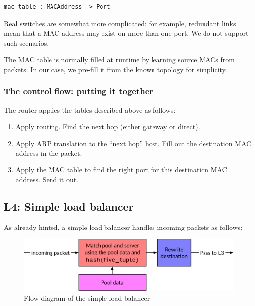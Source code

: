 \documentclass[11pt,oneside,a4paper]{article}
\begin{document}
\begin{verbatim}
mac_table : MACAddress -> Port
\end{verbatim}

Real switches are somewhat more complicated: for example, redundant links mean
that a MAC address may exist on more than one port.
We do not support such scenarios.

The MAC table is normally filled at runtime by learning source MACs from
packets.
In our case, we pre-fill it from the known topology for simplicity.

\subsubsection{The control flow: putting it together}
The router applies the tables described above as follows:

\begin{enumerate}
\item Apply routing.
    Find the next hop (either gateway or direct).
\item Apply ARP translation to the ``next hop'' host.
    Fill out the destination MAC address in the packet.
\item Apply the MAC table to find the right port for this destination MAC address.
    Send it out.
\end{enumerate}

\subsection{L4: Simple load balancer}
As already hinted, a simple load balancer handles incoming packets as follows:

\begin{figure}[h]
\centering
\includegraphics[width=.8\textwidth]{figures/simple-packet.pdf}
\caption{Flow diagram of the simple load balancer}
\label{fig:simple-packet}
\end{figure}
\end{document}
